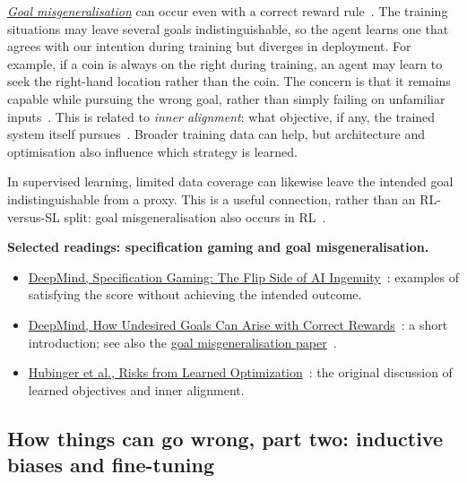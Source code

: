 \href{https://deepmind.google/blog/how-undesired-goals-can-arise-with-correct-rewards/}{\emph{Goal misgeneralisation}} can occur even with a correct reward rule~\cite{shah2022correctRewards}. The training situations may leave several goals indistinguishable, so the agent learns one that agrees with our intention during training but diverges in deployment. For example, if a coin is always on the right during training, an agent may learn to seek the right-hand location rather than the coin. The concern is that it remains capable while pursuing the wrong goal, rather than simply failing on unfamiliar inputs~\cite{shah2022misgeneralization}. This is related to \emph{inner alignment}: what objective, if any, the trained system itself pursues~\cite{hubinger2019learnedOptimization}. Broader training data can help, but architecture and optimisation also influence which strategy is learned.

In supervised learning, limited data coverage can likewise leave the intended goal indistinguishable from a proxy. This is a useful connection, rather than an RL-versus-SL split: goal misgeneralisation also occurs in RL~\cite{shah2022misgeneralization}.

\noindent\textbf{Selected readings: specification gaming and goal misgeneralisation.}
\begin{itemize}
  \item \href{https://deepmind.google/blog/specification-gaming-the-flip-side-of-ai-ingenuity/}{DeepMind, Specification Gaming: The Flip Side of AI Ingenuity}~\cite{krakovna2020specificationGaming}: examples of satisfying the score without achieving the intended outcome.
  \item \href{https://deepmind.google/blog/how-undesired-goals-can-arise-with-correct-rewards/}{DeepMind, How Undesired Goals Can Arise with Correct Rewards}~\cite{shah2022correctRewards}: a short introduction; see also the \href{https://arxiv.org/abs/2210.01790}{goal misgeneralisation paper}~\cite{shah2022misgeneralization}.
  \item \href{https://arxiv.org/abs/1906.01820}{Hubinger et al., Risks from Learned Optimization}~\cite{hubinger2019learnedOptimization}: the original discussion of learned objectives and inner alignment.
\end{itemize}

\subsection{How things can go wrong, part two: inductive biases and fine-tuning}

